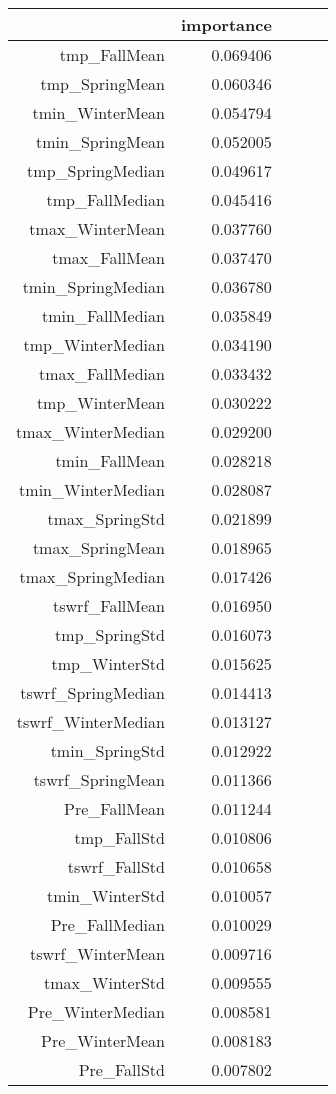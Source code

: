 \begin{tabular}{rrrrr}
\toprule
 & importance \\
\midrule
tmp_FallMean & 0.069406 \\
tmp_SpringMean & 0.060346 \\
tmin_WinterMean & 0.054794 \\
tmin_SpringMean & 0.052005 \\
tmp_SpringMedian & 0.049617 \\
tmp_FallMedian & 0.045416 \\
tmax_WinterMean & 0.037760 \\
tmax_FallMean & 0.037470 \\
tmin_SpringMedian & 0.036780 \\
tmin_FallMedian & 0.035849 \\
tmp_WinterMedian & 0.034190 \\
tmax_FallMedian & 0.033432 \\
tmp_WinterMean & 0.030222 \\
tmax_WinterMedian & 0.029200 \\
tmin_FallMean & 0.028218 \\
tmin_WinterMedian & 0.028087 \\
tmax_SpringStd & 0.021899 \\
tmax_SpringMean & 0.018965 \\
tmax_SpringMedian & 0.017426 \\
tswrf_FallMean & 0.016950 \\
tmp_SpringStd & 0.016073 \\
tmp_WinterStd & 0.015625 \\
tswrf_SpringMedian & 0.014413 \\
tswrf_WinterMedian & 0.013127 \\
tmin_SpringStd & 0.012922 \\
tswrf_SpringMean & 0.011366 \\
Pre_FallMean & 0.011244 \\
tmp_FallStd & 0.010806 \\
tswrf_FallStd & 0.010658 \\
tmin_WinterStd & 0.010057 \\
Pre_FallMedian & 0.010029 \\
tswrf_WinterMean & 0.009716 \\
tmax_WinterStd & 0.009555 \\
Pre_WinterMedian & 0.008581 \\
Pre_WinterMean & 0.008183 \\
Pre_FallStd & 0.007802 \\

\end{tabular}
